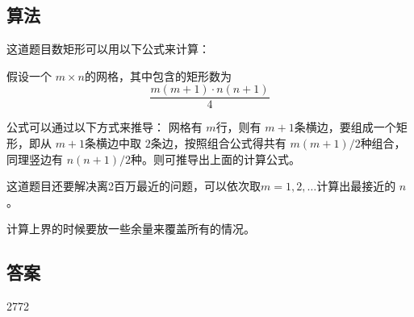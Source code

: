 \subsection{算法}
这道题目数矩形可以用以下公式来计算：

假设一个 \( m \times n \)的网格，其中包含的矩形数为
\begin{equation*}
    \dfrac{m(m+1) \cdot n(n+1)}{4}
\end{equation*}

公式可以通过以下方式来推导：
网格有 \( m \)行，则有 \( m + 1 \)条横边，要组成一个矩形，即从 \( m + 1 \)条横边中取 \( 2 \)条边，按照组合公式得共有 \(
m (m + 1) / 2\)种组合，同理竖边有 \( n ( n + 1) / 2 \)种。则可推导出上面的计算公式。

这道题目还要解决离2百万最近的问题，可以依次取$ m=1, 2, \dots $计算出最接近的 $n$。

计算上界的时候要放一些余量来覆盖所有的情况。
\subsection{答案}
2772
